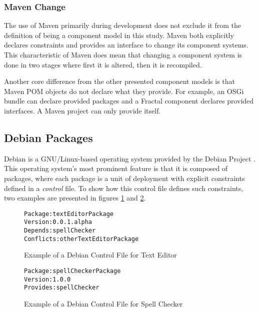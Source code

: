 \subsubsection{Maven Change}
The use of Maven primarily during development does not exclude it from the definition of being a component model in this study.
Maven both explicitly declares constraints and provides an interface to change its component systems. 
This characteristic of Maven does mean that changing a component system is done in two stages where first it is altered, then it is recompiled.

Another core difference from the other presented component models is that Maven POM objects do not declare what they provide.
For example, an OSGi bundle can declare provided packages and a Fractal component declares provided interfaces.
A Maven project can only provide itself. 

\subsection{Debian Packages}
\label{background.debianPackages}
Debian is a GNU/Linux-based operating system provided by the Debian Project \citep{Barth2005}.
This operating system's most prominent feature is that it is composed of packages, where each package is a unit of deployment with explicit constraints defined in a \textit{control} file.
To show how this control file defines such constraints, two examples are presented in figures \ref{debianmetadatate} and \ref{debianmetadatasc}.

\begin{figure}[htp]
\begin{center}
\begin{framed}
\begin{alltt}
Package: textEditorPackage
Version: 0.0.1.alpha
Depends: spellChecker
Conflicts: otherTextEditorPackage
\end{alltt}
\end{framed}
  \caption[Debian Control file for Text Editor]{Example of a Debian Control File for Text Editor}
  \label{debianmetadatate}
\end{center}
\end{figure}

\begin{figure}[htp]
\begin{center}
\begin{framed}
\begin{alltt}
Package: spellCheckerPackage
Version: 1.0.0
Provides: spellChecker
\end{alltt}
\end{framed}
  \caption{Example of a Debian Control File for Spell Checker}
  \label{debianmetadatasc}
\end{center}
\end{figure}

